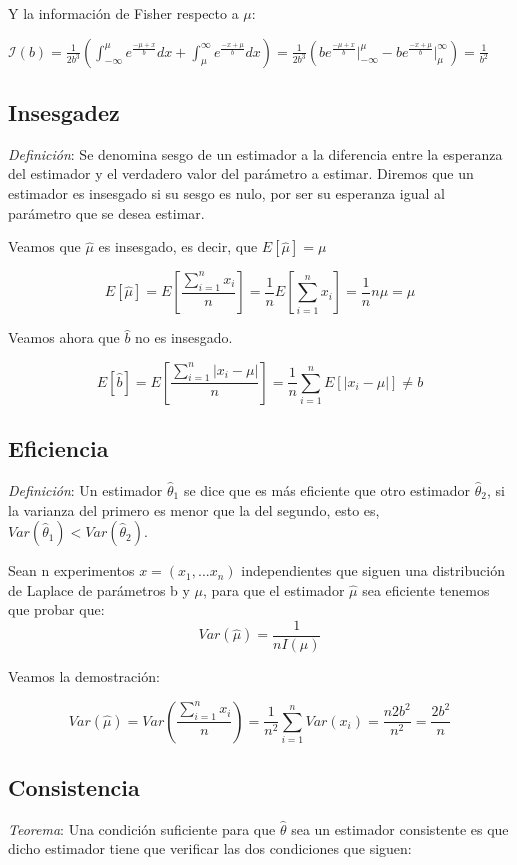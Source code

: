 \documentclass[a4paper, 10pt]{article} %
\begin{document}
Y la información de Fisher respecto a $\mu$:

$ \displaystyle \mathcal{I}(b) = \frac{1}{2b^3} \left(\int^\mu_{-\infty} e^{\frac{-\mu+x}{b}} dx +
\int^\infty_{\mu} e^{\frac{-x+\mu}{b}} dx \right) =  \frac{1}{2b^3} \left( b e^{\frac{-\mu+x}{b}} \Big|^\mu_{-\infty} -
b e^{\frac{-x+\mu}{b}} \Big|^\infty_{\mu}\right) = \frac{1}{b^2}$

\subsection{Insesgadez}
\emph{Definición}: Se denomina sesgo de un estimador a la diferencia entre la esperanza del estimador
y el verdadero valor del parámetro a estimar. Diremos que un estimador es insesgado si su sesgo es nulo, por ser
su esperanza igual al parámetro que se desea estimar.

Veamos que $\hat{\mu}$ es insesgado, es decir, que  $E\left[\hat{\mu}\right]=\mu$

$$E\left[\hat{\mu}\right] = E\left[\frac{\sum_{i=1}^{n}x_i}{n}\right] = \frac{1}{n}E\left[\sum_{i=1}^{n}x_i\right] = \frac{1}{n}n\mu = \mu $$

Veamos ahora que $\hat{b}$ no es insesgado. 

$$E\left[\hat{b}\right] = E\left[\frac{\sum_{i=1}^{n}|x_i - \mu|}{n}\right] = \frac{1}{n}\sum_{i=1}^{n}E\left[|x_i - \mu|\right] \neq b$$ 

\subsection{Eficiencia}
\emph{Definición}: Un estimador $\hat{\theta}_1$ se dice que es más eficiente que otro estimador
$\hat{\theta}_2$, si la varianza del primero es menor que la del segundo, esto es,  $Var(\hat{\theta}_1)<Var(\hat{\theta}_2)$.

Sean n experimentos $x=(x_1,...x_n)$ independientes que siguen una distribución de Laplace de parámetros b y $\mu$, para que el
estimador $\hat{\mu}$ sea eficiente tenemos que probar que:
$$Var(\hat{\mu})=\frac{1}{nI(\mu)}$$

Veamos la demostración: 

$$Var(\hat{\mu}) = Var\left(\frac{\sum_{i=1}^{n}x_i}{n}\right) = \frac{1}{n^2}\sum_{i=1}^{n}Var(x_i) = \frac{n 2 b^2}{n^2} =
\frac{2 b^2}{n}$$

\subsection{Consistencia}
\emph{Teorema}: Una condición suficiente para que $\hat{\theta}$ sea un estimador consistente es que
dicho estimador tiene que verificar las dos condiciones que siguen:
\end{document}
